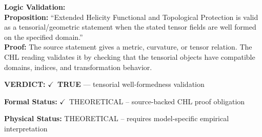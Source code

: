 \textbf{Logic Validation:}\\
\textbf{Proposition:} ``Extended Helicity Functional and Topological Protection is valid as a
tensorial/geometric statement when the stated tensor fields are well formed on the
specified domain.''\\
\textbf{Proof:} The source statement gives a metric, curvature, or tensor relation. The CHL reading
validates it by checking that the tensorial objects have compatible domains, indices,
and transformation behavior.

\textbf{VERDICT:} \ensuremath{\checkmark}\ \textbf{TRUE} --- tensorial well-formedness validation

\textbf{Formal Status:} \ensuremath{\checkmark}\ THEORETICAL -- source-backed CHL proof obligation

\textbf{Physical Status:} THEORETICAL -- requires model-specific empirical interpretation
\par\vspace{0.45em}
\par
\ifTZPDarkEdition
{}
\fi
\endgroup
\endgroup

